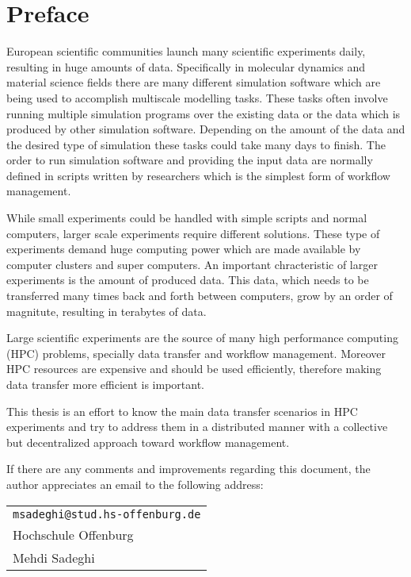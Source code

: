 \chapter*{Preface}
\label{cha:preface}

European scientific communities launch many scientific experiments daily, resulting in huge amounts
of data. Specifically in molecular dynamics and material science fields there are many different
simulation software which are being used to accomplish multiscale modelling tasks. These tasks
often involve running multiple simulation programs over the existing data or the data which is
produced by other simulation software. Depending on the amount of the data and the desired type of simulation
these tasks could take many days to finish. The order to run simulation software and 
providing the input data are normally defined in scripts written by researchers which is the simplest
form of workflow management.

While small experiments could be handled with simple scripts and normal computers, larger scale experiments
require different solutions. These type of experiments demand huge computing power which are made available by
computer clusters and super computers. An important chracteristic of larger experiments is
the amount of produced data. This data, which needs to be transferred many times back and forth
between computers, grow by an order of magnitute, resulting in terabytes of data.

Large scientific experiments are the source of many high performance computing (HPC) problems, specially data transfer
and workflow management. Moreover HPC resources are expensive and should be used efficiently, therefore making data transfer
more efficient is important.

This thesis is an effort to know the main data transfer scenarios in HPC experiments and try to address them in
a distributed manner with a collective but decentralized approach toward workflow management.


%
%

If there are any comments and improvements regarding this document, the author
appreciates an email to the following address:

\begin{center}
\begin{tabular}{l}
\nolinkurl{msadeghi@stud.hs-offenburg.de} \\
Hochschule Offenburg\\
Mehdi Sadeghi
\end{tabular}
\end{center}




